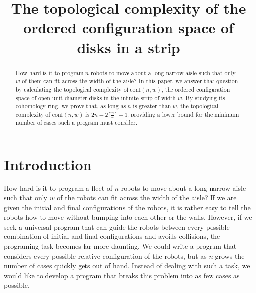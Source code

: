 
\title{The topological complexity of the ordered configuration space of disks in a strip}
\maketitle

\begin{abstract}
How hard is it to program $n$ robots to move about a long narrow aisle such that only $w$ of them can fit across the width of the aisle?
In this paper, we answer that question by calculating the topological complexity of $\text{conf}(n,w)$, the ordered configuration space of open unit-diameter disks in the infinite strip of width $w$.
By studying its cohomology ring, we prove that, as long as $n$ is greater than $w$, the topological complexity of $\text{conf}(n,w)$ is $2n-2\big\lceil\frac{n}{w}\big\rceil+1$, providing a lower bound for the minimum number of cases such a program must consider.
\end{abstract}

\section{Introduction}

How hard is it to program a fleet of $n$ robots to move about a long narrow aisle such that only $w$ of the robots can fit across the width of the aisle?
If we are given the initial and final configurations of the robots, it is rather easy to tell the robots how to move without bumping into each other or the walls.
However, if we seek a universal program that can guide the robots between every possible combination of initial and final configurations and avoids collisions, the programing task becomes far more daunting.
We could write a program that considers every possible relative configuration of the robots, but as $n$ grows the number of cases quickly gets out of hand.
Instead of dealing with such a task, we would like to develop a program that breaks this problem into as few cases as possible.


